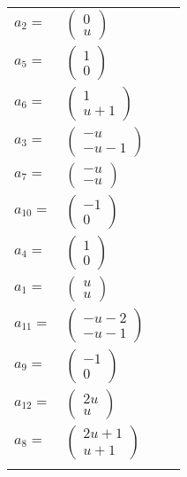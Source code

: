 \documentclass[1p]{elsarticle_modified}
\theoremstyle{definition}
\begin{document}
\begin{tabular}{m{7pt} m{180pt} m{7pt} m{180pt} }
\flushright $a_{2}=$&$\begin{pmatrix}0\\u\end{pmatrix}$ \\
\flushright $a_{5}=$&$\begin{pmatrix}1\\0\end{pmatrix}$ \\
\flushright $a_{6}=$&$\begin{pmatrix}1\\u+1\end{pmatrix}$ \\
\flushright $a_{3}=$&$\begin{pmatrix}- u\\- u-1\end{pmatrix}$ \\
\flushright $a_{7}=$&$\begin{pmatrix}- u\\- u\end{pmatrix}$ \\
\flushright $a_{10}=$&$\begin{pmatrix}-1\\0\end{pmatrix}$ \\
\flushright $a_{4}=$&$\begin{pmatrix}1\\0\end{pmatrix}$ \\
\flushright $a_{1}=$&$\begin{pmatrix}u\\u\end{pmatrix}$ \\
\flushright $a_{11}=$&$\begin{pmatrix}- u-2\\- u-1\end{pmatrix}$ \\
\flushright $a_{9}=$&$\begin{pmatrix}-1\\0\end{pmatrix}$ \\
\flushright $a_{12}=$&$\begin{pmatrix}2 u\\u\end{pmatrix}$ \\
\flushright $a_{8}=$&$\begin{pmatrix}2 u+1\\u+1\end{pmatrix}$\\&\end{tabular}
\end{document}

